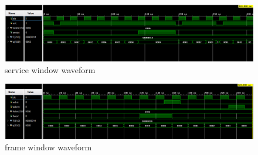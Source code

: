 \documentclass[10pt]{report}
\begin{document}
\begin{figure}[h]
\includegraphics[width=\textwidth,height=\textwidth,keepaspectratio]{service_window.png}
\caption{service window waveform}
\end{figure}

\begin{figure}[h]
\includegraphics[width=\textwidth,height=\textwidth,keepaspectratio]{frame_window.png}
\caption{frame window waveform}
\end{figure}
\end{document}
